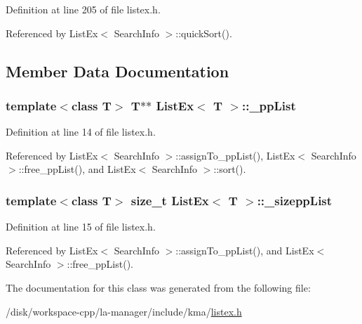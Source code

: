 Definition at line 205 of file listex.h.

Referenced by ListEx$<$ SearchInfo $>$::quickSort().

\subsection{Member Data Documentation}
\hypertarget{classListEx_1d03da1d1e0dc2d5fb097c31fa14456e}{
\subsubsection[{\_\-ppList}]{\setlength{\rightskip}{0pt plus 5cm}template$<$class T$>$ T$\ast$$\ast$ {\bf ListEx}$<$ T $>$::{\bf \_\-ppList}}}
\label{classListEx_1d03da1d1e0dc2d5fb097c31fa14456e}




Definition at line 14 of file listex.h.

Referenced by ListEx$<$ SearchInfo $>$::assignTo\_\-ppList(), ListEx$<$ SearchInfo $>$::free\_\-ppList(), and ListEx$<$ SearchInfo $>$::sort().\hypertarget{classListEx_933351b4aa581888325912316a905738}{
\subsubsection[{\_\-sizeppList}]{\setlength{\rightskip}{0pt plus 5cm}template$<$class T$>$ size\_\-t {\bf ListEx}$<$ T $>$::{\bf \_\-sizeppList}}}
\label{classListEx_933351b4aa581888325912316a905738}




Definition at line 15 of file listex.h.

Referenced by ListEx$<$ SearchInfo $>$::assignTo\_\-ppList(), and ListEx$<$ SearchInfo $>$::free\_\-ppList().

The documentation for this class was generated from the following file:\begin{CompactItemize}
\item 
/disk/workspace-cpp/la-manager/include/kma/\hyperlink{listex_8h}{listex.h}\end{CompactItemize}
